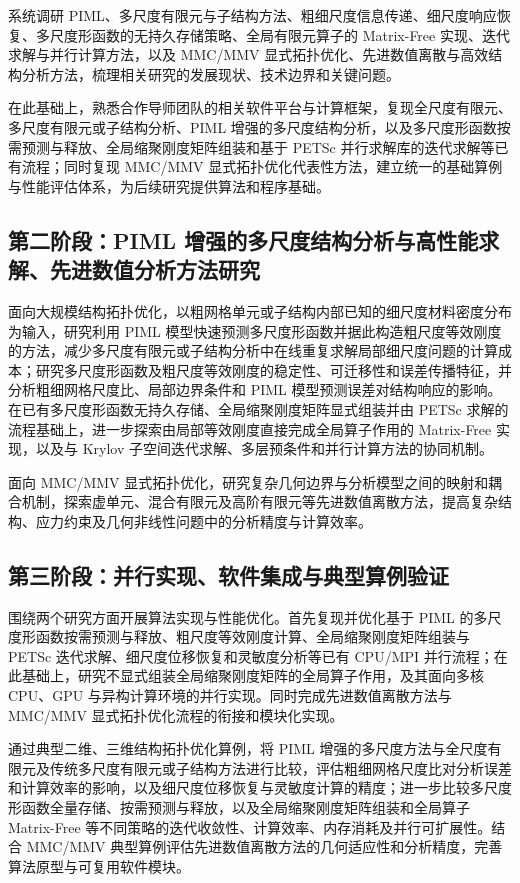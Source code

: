 \documentclass[zihao=-4,a4paper]{ctexart}
\begin{document}
系统调研 PIML、多尺度有限元与子结构方法、粗细尺度信息传递、细尺度响应恢复、多尺度形函数的无持久存储策略、全局有限元算子的 Matrix-Free 实现、迭代求解与并行计算方法，以及 MMC/MMV 显式拓扑优化、先进数值离散与高效结构分析方法，梳理相关研究的发展现状、技术边界和关键问题。

在此基础上，熟悉合作导师团队的相关软件平台与计算框架，复现全尺度有限元、多尺度有限元或子结构分析、PIML 增强的多尺度结构分析，以及多尺度形函数按需预测与释放、全局缩聚刚度矩阵组装和基于 PETSc 并行求解库的迭代求解等已有流程；同时复现 MMC/MMV 显式拓扑优化代表性方法，建立统一的基础算例与性能评估体系，为后续研究提供算法和程序基础。

\subsection*{第二阶段：PIML 增强的多尺度结构分析与高性能求解、先进数值分析方法研究}

面向大规模结构拓扑优化，以粗网格单元或子结构内部已知的细尺度材料密度分布为输入，研究利用 PIML 模型快速预测多尺度形函数并据此构造粗尺度等效刚度的方法，减少多尺度有限元或子结构分析中在线重复求解局部细尺度问题的计算成本；研究多尺度形函数及粗尺度等效刚度的稳定性、可迁移性和误差传播特征，并分析粗细网格尺度比、局部边界条件和 PIML 模型预测误差对结构响应的影响。在已有多尺度形函数无持久存储、全局缩聚刚度矩阵显式组装并由 PETSc 求解的流程基础上，进一步探索由局部等效刚度直接完成全局算子作用的 Matrix-Free 实现，以及与 Krylov 子空间迭代求解、多层预条件和并行计算方法的协同机制。

面向 MMC/MMV 显式拓扑优化，研究复杂几何边界与分析模型之间的映射和耦合机制，探索虚单元、混合有限元及高阶有限元等先进数值离散方法，提高复杂结构、应力约束及几何非线性问题中的分析精度与计算效率。

\subsection*{第三阶段：并行实现、软件集成与典型算例验证}

围绕两个研究方面开展算法实现与性能优化。首先复现并优化基于 PIML 的多尺度形函数按需预测与释放、粗尺度等效刚度计算、全局缩聚刚度矩阵组装与 PETSc 迭代求解、细尺度位移恢复和灵敏度分析等已有 CPU/MPI 并行流程；在此基础上，研究不显式组装全局缩聚刚度矩阵的全局算子作用，及其面向多核 CPU、GPU 与异构计算环境的并行实现。同时完成先进数值离散方法与 MMC/MMV 显式拓扑优化流程的衔接和模块化实现。

通过典型二维、三维结构拓扑优化算例，将 PIML 增强的多尺度方法与全尺度有限元及传统多尺度有限元或子结构方法进行比较，评估粗细网格尺度比对分析误差和计算效率的影响，以及细尺度位移恢复与灵敏度计算的精度；进一步比较多尺度形函数全量存储、按需预测与释放，以及全局缩聚刚度矩阵组装和全局算子 Matrix-Free 等不同策略的迭代收敛性、计算效率、内存消耗及并行可扩展性。结合 MMC/MMV 典型算例评估先进数值离散方法的几何适应性和分析精度，完善算法原型与可复用软件模块。
\end{document}
